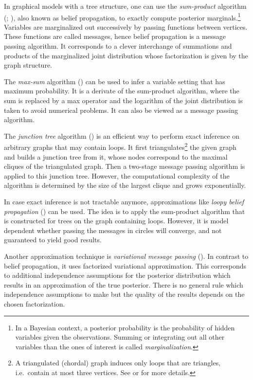 In graphical models with a tree structure, one can use the \emph{sum-product} algorithm (\cite{pearl1988probabilistic}; \cite{kim1983computational}), also known as belief propagation, to exactly compute posterior marginals.\footnote{In a Bayesian context, a posterior probability is the probability of hidden variables given the observations. Summing or integrating out all other variables than the ones of interest is called \emph{marginalization}.} Variables are marginalized out successively by passing functions between vertices. These functions are called messages, hence belief propagation is a message passing algorithm. It corresponds to a clever interchange of summations and products of the marginalized joint distribution whose factorization is given by the graph structure. 

The \emph{max-sum} algorithm (\cite{dawid1992applications}) can be used to infer a variable setting that has maximum probability. It is a derivate of the sum-product algorithm, where the sum is replaced by a max operator and the logarithm of the joint distribution is taken to avoid numerical problems. It can also be viewed as a message passing algorithm.

The \emph{junction tree} algorithm (\cite{lauritzen1988local}) is an efficient way to perform exact inference on arbitrary graphs that may contain loops. It first triangulates\footnote{A triangulated (chordal) graph induces only loops that are triangles, i.e.~contain at most three vertices.  See \textcite{fulkerson1965incidence} or \textcite{rose1976algorithmic} for more details.} the given graph and builds a junction tree from it, whose nodes correspond to the maximal cliques of the triangulated graph. Then a two-stage message passing algorithm is applied to this junction tree. However, the computational complexity of the algorithm is determined by the size of the largest clique and grows exponentially.

In case exact inference is not tractable anymore, approximations like \emph{loopy belief propagation} (\cite{frey1998revolution}) can be used. The idea is to apply the sum-product algorithm that is constructed for trees on the graph containing loops. However, it is model dependent whether passing the messages in circles will converge, and not guaranteed to yield good results.

Another approximation technique is \emph{variational message passing} (\cite{winn2005variational}). In contrast to belief propagation, it uses factorized variational approximation. This corresponds to additional independence assumptions for the posterior distribution which results in an approximation of the true posterior. There is no general rule which independence assumptions to make but the quality of the results depends on the chosen factorization.

